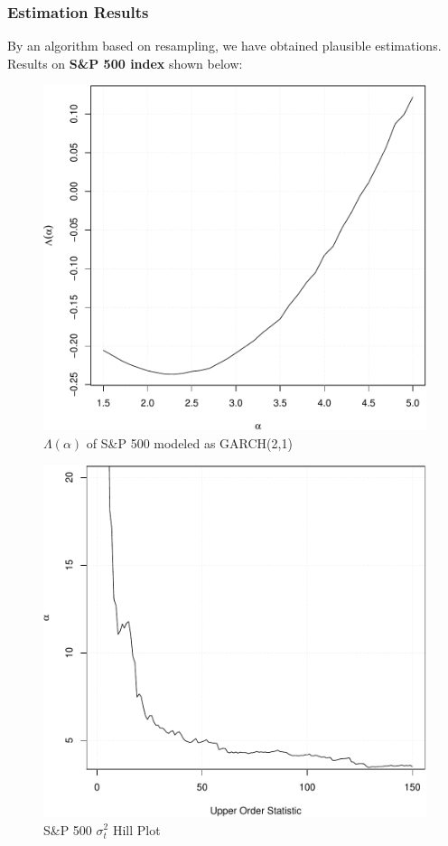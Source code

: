 \documentclass{beamer}
\begin{document}
 \begin{frame}
   \frametitle{Estimation Results}
   By an algorithm based on resampling, we have obtained plausible
   estimations. Results on {\bf S\&P 500 index} shown below:
   \begin{minipage}{0.5\linewidth}
   \begin{figure}[htb!]
     \centering
     \includegraphics[width=\linewidth]{Lambda.pdf}     
     \caption{\tiny $\Lambda(\alpha)$ of S\&P 500 modeled as GARCH(2,1)}
     \label{fig:SP500_Lambda}
   \end{figure}
   \end{minipage}\hfill
   \begin{minipage}{0.5\linewidth}
     \begin{figure}[htb!]
       \centering
       \includegraphics[width=\linewidth]{SP500_var_HillPlot.pdf}
       \caption{S\&P 500 $\sigma_t^2$ Hill Plot}
       \label{fig:SP500_var_HillPlot}
     \end{figure}
   \end{minipage}


\end{frame}
\end{document}

